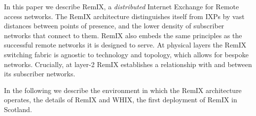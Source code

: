 In this paper we describe RemIX, a \emph{distributed} Internet Exchange for
Remote access networks. The RemIX architecture distinguishes itself from \acp{IXP}
 by vast distances between points of presence, and the lower density
of subscriber networks that connect to them. RemIX also embeds the same
principles as the successful remote networks it is designed to serve.
At physical layers the RemIX switching fabric is agnostic to technology and
topology, which allows for bespoke networks. Crucially, at layer-2 RemIX
establishes a relationship with and between its subscriber networks.

In the following we describe the environment in which the  RemIX architecture operates, the details of RemIX and   WHIX, the first deployment of RemIX  in Scotland.

